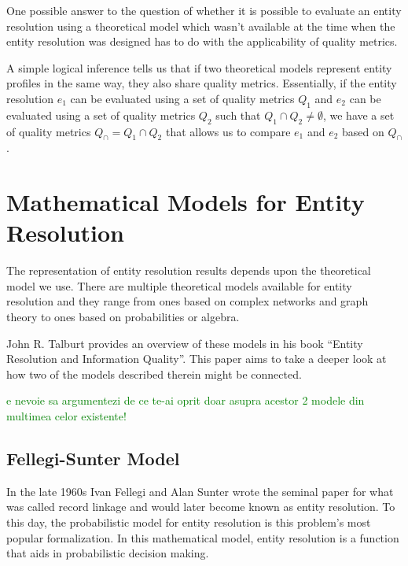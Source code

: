 \documentclass[journal]{IEEEtran}
\begin{document}
    One possible answer to the question of whether it is possible to evaluate
    an entity resolution using a theoretical model which wasn't available at the
    time when the entity resolution was designed has to do with the
    applicability of quality metrics.

    A simple logical inference tells us that if two theoretical models represent
    entity profiles in the same way, they also share quality metrics.
    Essentially, if the entity resolution $e_1$ can be evaluated using a set of
    quality metrics $Q_1$ and $e_2$ can be evaluated using a set of quality
    metrics $Q_2$ such that $Q_1 \cap Q_2 \neq \emptyset$, we have a set of
    quality metrics $Q_\cap = Q_1 \cap Q_2$ that allows us to compare $e_1$ and
    $e_2$ based on $Q_\cap$.
    
    \section[mm]{Mathematical Models for Entity Resolution}\label{sec:mm}

    The representation of entity resolution results depends upon the theoretical
    model we use.
    There are multiple theoretical models available for entity resolution and
    they range from ones based on complex networks and graph theory\cite{Li2020}
    to ones based on probabilities\cite{fs1969} or
    algebra\cite{Tal11,Ben2009Swoosh}.

    John R. Talburt provides an overview of these models in his book ``Entity
    Resolution and Information Quality''\cite{Tal11}.
    This paper aims to take a deeper look at how two of the models described
    therein might be connected.

    \textcolor{green}{e nevoie sa argumentezi de ce te-ai oprit doar asupra acestor 2 modele din multimea celor existente!}

    \subsection[fsm]{Fellegi-Sunter Model}\label{subsec:fsm}

    In the late 1960s Ivan Fellegi and Alan Sunter wrote the seminal
    paper\cite{fs1969} for what was called record linkage and would later become
    known as entity resolution.
    To this day, the probabilistic model for entity resolution is this problem's
    most popular formalization.
    In this mathematical model, entity resolution is a function that aids in 
    probabilistic decision making.
    
\end{document}

